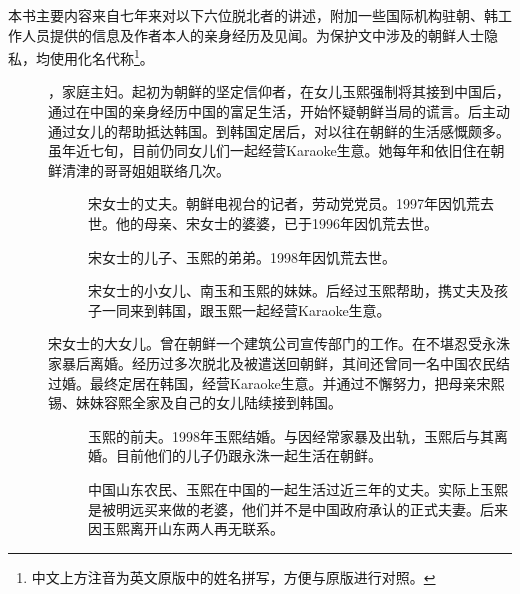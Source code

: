 \ifnum{}
	\begin{multicols}{\theparacolNo}
\fi
本书主要内容来自七年来对以下六位脱北者的讲述，附加一些国际机构驻朝、韩工作人员提供的信息及作者本人的亲身经历及见闻。为保护文中涉及的朝鲜人士隐私，均使用化名代称\footnote{中文上方注音为英文原版中的姓名拼写，方便与原版进行对照。}。\\

\begin{description}
	\item[] ，家庭主妇。起初为朝鲜的坚定信仰者，在女儿玉熙强制将其接到中国后，通过在中国的亲身经历中国的富足生活，开始怀疑朝鲜当局的谎言。后主动通过女儿的帮助抵达韩国。到韩国定居后，对以往在朝鲜的生活感慨颇多。虽年近七旬，目前仍同女儿们一起经营Karaoke生意。她每年和依旧住在朝鲜清津的哥哥姐姐联络几次。
		{\footnotesize \begin{description}
			\item[] 宋女士的丈夫。朝鲜电视台的记者，劳动党党员。1997年因饥荒去世。他的母亲、宋女士的婆婆，已于1996年因饥荒去世。
			\item[] 宋女士的儿子、玉熙的弟弟。1998年因饥荒去世。
			\item[] 宋女士的小女儿、南玉和玉熙的妹妹。后经过玉熙帮助，携丈夫及孩子一同来到韩国，跟玉熙一起经营Karaoke生意。
		\end{description}}
		
	\item[] 宋女士的大女儿。曾在朝鲜一个建筑公司宣传部门的工作。在不堪忍受永洙家暴后离婚。经历过多次脱北及被遣送回朝鲜，其间还曾同一名中国农民结过婚。最终定居在韩国，经营Karaoke生意。并通过不懈努力，把母亲宋熙锡、妹妹容熙全家及自己的女儿陆续接到韩国。
		{\footnotesize \begin{description}
			\item[] 玉熙的前夫。1998年玉熙结婚。与因经常家暴及出轨，玉熙后与其离婚。目前他们的儿子仍跟永洙一起生活在朝鲜。
			\item[] 中国山东农民、玉熙在中国的一起生活过近三年的丈夫。实际上玉熙是被明远买来做的老婆，他们并不是中国政府承认的正式夫妻。后来因玉熙离开山东两人再无联系。
		\end{description}}


\end{description}
\end{multicols}
